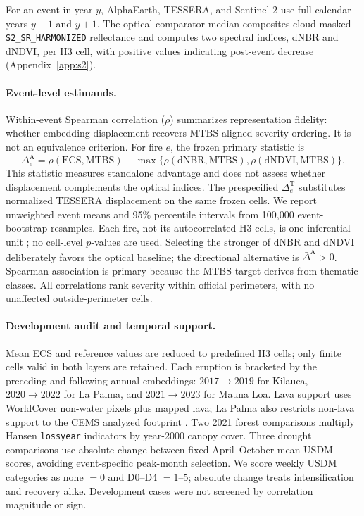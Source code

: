 \documentclass{article}
\newcommand{\ECS}{\mathrm{ECS}}
\begin{document}
For an event in year $y$, AlphaEarth, TESSERA, and Sentinel-2 use full calendar
years $y-1$ and $y+1$. The optical comparator median-composites cloud-masked
\texttt{S2\_SR\_HARMONIZED} reflectance \citep{esa2021sentinel2} and computes
two spectral indices, dNBR and dNDVI, per H3 cell, with positive values
indicating post-event decrease (Appendix~\ref{app:s2}).

\paragraph{Event-level estimands.}
Within-event Spearman correlation ($\rho$) summarizes representation fidelity:
whether embedding displacement recovers MTBS-aligned severity ordering. It is
not an equivalence criterion. For fire $e$, the frozen primary statistic is
\[
\Delta_e^{\mathrm{A}}=\rho(\ECS,\mathrm{MTBS})
-\max\{\rho(\mathrm{dNBR},\mathrm{MTBS}),
\rho(\mathrm{dNDVI},\mathrm{MTBS})\}.
\]
This statistic measures standalone advantage and does not assess whether
displacement complements the optical indices. The prespecified
$\Delta_e^{\mathrm{T}}$ substitutes normalized TESSERA displacement on the
same frozen cells. We report unweighted event means and 95\% percentile
intervals from 100,000 event-bootstrap resamples. Each fire, not its
autocorrelated H3 cells, is one inferential unit \citep{clifford1989spatial};
no cell-level $p$-values are used. Selecting the stronger of dNBR and dNDVI
deliberately favors the optical baseline; the directional alternative is
$\bar{\Delta}^{\mathrm{A}}>0$. Spearman association is primary because the
MTBS target derives from thematic classes. All correlations rank severity
within official perimeters, with no unaffected outside-perimeter cells.

\paragraph{Development audit and temporal support.}
Mean ECS and reference values are reduced to predefined H3 cells; only finite
cells valid in both layers are retained. Each eruption is bracketed by the
preceding and following annual embeddings: $2017\rightarrow2019$ for Kilauea,
$2020\rightarrow2022$ for La Palma, and $2021\rightarrow2023$ for Mauna Loa.
Lava support uses WorldCover non-water pixels plus mapped lava; La Palma also
restricts non-lava support to the CEMS analyzed footprint
\citep{zanaga2021worldcover}. Two 2021 forest comparisons multiply Hansen
\texttt{lossyear} indicators by year-2000 canopy cover. Three drought
comparisons use absolute change between fixed April--October mean USDM scores,
avoiding event-specific peak-month selection. We score weekly USDM categories
as none $=0$ and D0--D4 $=1$--$5$; absolute change treats intensification and
recovery alike. Development cases were not screened by correlation magnitude
or sign.
\end{document}
